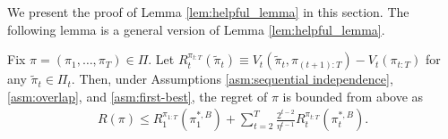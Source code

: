 We present the proof of Lemma \ref{lem:helpful_lemma} in this section. 
The following lemma is a general version of Lemma \ref{lem:helpful_lemma}.

\medskip

\begin{lemma}\label{lem:helpful_lemma_general}
Fix $\pi=(\pi_1,\ldots,\pi_T)\in \Pi$. Let  $R_{t}^{\pi_{t:T}}(\tilde{\pi}_t)  \equiv  V_{t}(\tilde{\pi}_t,\pi_{(t+1):T}) - V_{t}(\pi_{t:T})$ for any $\tilde{\pi}_t \in \Pi_t$. Then, under Assumptions \ref{asm:sequential independence}, \ref{asm:overlap}, and \ref{asm:first-best}, the regret of $\pi$ is bounded from above as
\begin{align*}
    R(\pi) \leq R_{1}^{\pi_{1:T}}(\pi_{1}^{\ast,B}) + \sum_{t=2}^{T} \frac{2^{t-2}}{\eta^{t-1}} R_{t}^{\pi_{t:T}}(\pi_{t}^{\ast,B}). 
\end{align*}
\end{lemma}


